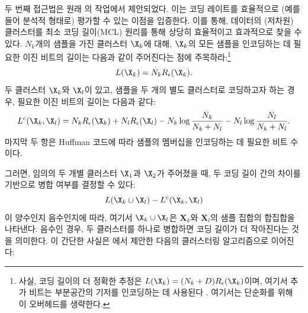 \documentclass[../../book-main_ko.tex]{subfiles}
\begin{document}
두 번째 접근법은 원래 \cite{ma2007segmentation}의 작업에서 제안되었다. 이는 코딩 레이트를 효율적으로 (예를 들어 분석적 형태로) 평가할 수 있는 이점을 입증한다. 이를 통해, 데이터의 (저차원) 클러스터를 최소 코딩 길이(MCL) 원리를 통해 상당히 효율적이고 효과적으로 찾을 수 있다. $N_k$개의 샘플을 가진 클러스터 $\X_k$에 대해, $\X_k$의 모든 샘플을 인코딩하는 데 필요한 이진 비트의 길이는 다음과 같이 주어진다는 점에 주목하라:\footnote{사실, 코딩 길이의 더 정확한 추정은 $L(\X_k) = (N_k+D) R_\epsilon(\X_k)$이며, 여기서 추가 비트는 부분공간의 기저를 인코딩하는 데 사용된다 \cite{ma2007segmentation}. 여기서는 단순화를 위해 이 오버헤드를 생략한다.}
\begin{equation}
	L(\X_k) = N_k R_\epsilon(\X_k).
\end{equation}
두 클러스터 $\X_k$와 $\X_l$이 있고, 샘플을 두 개의 별도 클러스터로 코딩하고자 하는 경우, 필요한 이진 비트의 길이는 다음과 같다:
\begin{equation*}
	L^c(\X_k, \X_l) = N_k R_\epsilon(\X_k) + N_l R_\epsilon(\X_l) - N_k \log\frac{N_k}{N_k + N_l} - N_l \log\frac{N_l}{N_k + N_l}.
\end{equation*}
마지막 두 항은 Huffman 코드에 따라 샘플의 멤버십을 인코딩하는 데 필요한 비트 수이다.

그러면, 임의의 두 개별 클러스터 $\X_1$과 $\X_2$가 주어졌을 때, 두 코딩 길이 간의 차이를 기반으로 병합 여부를 결정할 수 있다:
\begin{equation}
	L(\X_k \cup \X_l) - L^c(\X_k, \X_l)
\end{equation}
이 양수인지 음수인지에 따라, 여기서 $\X_k \cup \X_l$은 $\bm X_k$와 $\bm X_l$의 샘플 집합의 합집합을 나타낸다. 음수인 경우, 두 클러스터를 하나로 병합하면 코딩 길이가 더 작아진다는 것을 의미한다. 이 간단한 사실은 \cite{ma2007segmentation}에서 제안한 다음의 클러스터링 알고리즘으로 이어진다:

\begin{algorithm}[!htbp]
	\caption{코딩 길이의 쌍별 최급 하강}\label{alg:steepest_descent_coding_length}
	\begin{algorithmic}[1]

		 
		 
		\State{\Return{\(\cC\)}} 
		\Else
		 
		 
		\EndIf
		\EndWhile
		\State{\Return{\(\cC\)}}  
		\EndProcedure
	\end{algorithmic}
\end{algorithm}
\end{document}
